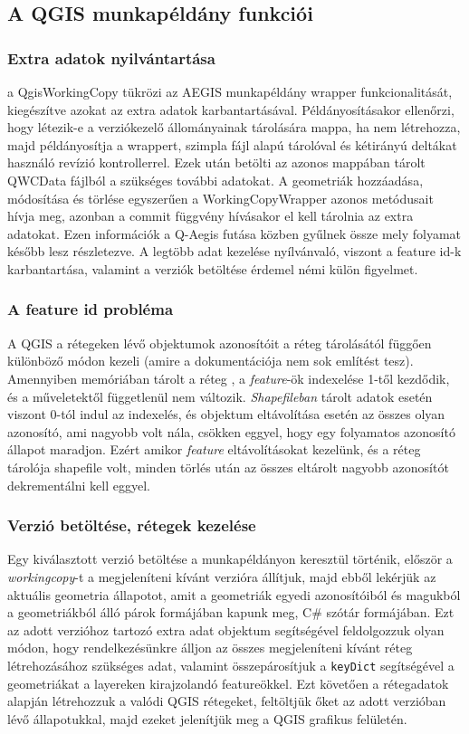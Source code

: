 \subsection{A QGIS munkapéldány funkciói}
\subsubsection{Extra adatok nyilvántartása}
a QgisWorkingCopy tükrözi az AEGIS munkapéldány wrapper funkcionalitását, kiegészítve azokat az extra adatok karbantartásával. Példányosításakor ellenőrzi, hogy létezik-e a verziókezelő állományainak tárolására mappa, ha nem létrehozza, majd példányosítja a wrappert, szimpla fájl alapú tárolóval és kétirányú deltákat használó revízió kontrollerrel. Ezek után betölti az azonos mappában tárolt QWCData fájlból a szükséges további adatokat.
A geometriák hozzáadása, módosítása és törlése egyszerűen a WorkingCopyWrapper azonos metódusait hívja meg, azonban a commit függvény hívásakor el kell tárolnia az extra adatokat. Ezen információk a Q-Aegis futása közben gyűlnek össze mely folyamat később lesz részletezve. A legtöbb adat kezelése nyílvánvaló, viszont a feature id-k karbantartása, valamint a verziók betöltése érdemel némi külön figyelmet.
\subsubsection{A feature id probléma}
A QGIS a rétegeken lévő objektumok azonosítóit a réteg tárolásától függően különböző módon kezeli (amire a dokumentációja nem sok említést tesz). Amennyiben memóriában tárolt a réteg , a \emph{feature}-ök indexelése 1-től kezdődik, és a műveletektől függetlenül nem változik. \emph{Shapefileban} tárolt adatok esetén viszont 0-tól indul az indexelés, és objektum eltávolítása esetén az összes olyan azonosító, ami nagyobb volt nála, csökken eggyel, hogy egy folyamatos azonosító állapot maradjon. Ezért amikor \emph{feature} eltávolításokat kezelünk, és a réteg tárolója shapefile volt, minden törlés után az összes eltárolt nagyobb azonosítót dekrementálni kell eggyel.
\subsubsection{Verzió betöltése, rétegek kezelése}
Egy kiválasztott verzió betöltése a munkapéldányon keresztül történik, először a \emph{workingcopy}-t a megjeleníteni kívánt verzióra állítjuk, majd ebből lekérjük az aktuális geometria állapotot, amit a geometriák egyedi azonosítóiból és magukból a geometriákból álló párok formájában kapunk meg, C\# szótár formájában. Ezt az adott verzióhoz tartozó extra adat objektum segítségével feldolgozzuk olyan módon, hogy rendelkezésünkre álljon az összes megjeleníteni kívánt réteg létrehozásához szükséges adat, valamint összepárosítjuk a \texttt{keyDict} segítségével a geometriákat a layereken kirajzolandó featureökkel. Ezt követően a rétegadatok alapján létrehozzuk a valódi QGIS rétegeket, feltöltjük őket az adott verzióban lévő állapotukkal, majd ezeket jelenítjük meg a QGIS grafikus felületén.

